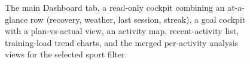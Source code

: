 \begin{figure}[ht]
\centering
{}
\caption[Dashboard tab]{The main Dashboard tab, a read-only cockpit combining an at-a-glance row (recovery, weather, last session, streak), a goal cockpit with a plan-vs-actual view, an activity map, recent-activity list, training-load trend charts, and the merged per-activity analysis views for the selected sport filter.}\label{fig:screenshot_activity}
\end{figure}
